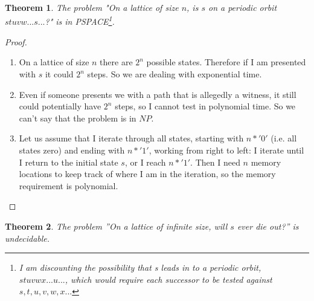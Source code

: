 \documentclass[]{article}
\newtheorem{thm}{Theorem}
\begin{document}
\begin{thm}
	The problem "On a lattice of size $n$, is $s$ on a periodic orbit $stuvw...s...$?" is in PSPACE\footnote{I am discounting the possibility that s \emph{leads in to} a periodic orbit, $stuvwx...u...$, which would require each successor to be tested against $s,t,u,v,w,x...$}.
\end{thm}

\begin{proof}
	\begin{enumerate}
		\item On a lattice of size $n$ there are $2^n$ possible states. Therefore if I am presented with $s$ it could  $2^n$ steps. So we are dealing with exponential time.
		\item Even if someone presents we with a path that is allegedly a witness, it still could potentially have $2^n$ steps, so I cannot test in polynomial time. So we can't say that the problem is in $NP$.
		\item Let us assume that I iterate through all states, starting with $n*'0'$ (i.e. all states zero) and ending with $n*'1'$, working from right to left: I iterate until I return to the initial state $s$, or I reach $n*'1'$. Then I need $n$ memory locations to keep track of where I am in the iteration, so the memory requirement is polynomial. 
	\end{enumerate}
\end{proof}

\begin{thm}\label{thm:undecideable}
	The problem ''On a lattice of infinite size, will $s$ ever die out?'' is undecidable.
\end{thm}
\end{document}
